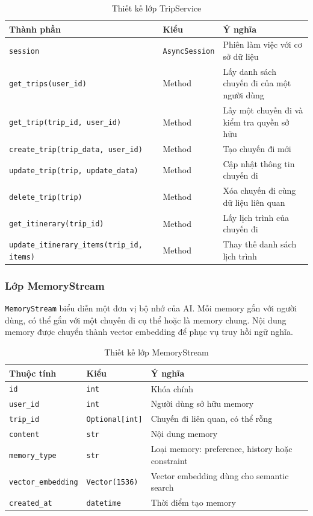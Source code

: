 \documentclass[../DoAn.tex]{subfiles}
\begin{document}
\begin{table}[H]
\centering
\begin{tabular}{lll}
\hline
\textbf{Thành phần} & \textbf{Kiểu} & \textbf{Ý nghĩa} \\ \hline
\texttt{session} & \texttt{AsyncSession} & Phiên làm việc với cơ sở dữ liệu \\ \hline
\texttt{get\_trips(user\_id)} & Method & Lấy danh sách chuyến đi của một người dùng \\ \hline
\texttt{get\_trip(trip\_id, user\_id)} & Method & Lấy một chuyến đi và kiểm tra quyền sở hữu \\ \hline
\texttt{create\_trip(trip\_data, user\_id)} & Method & Tạo chuyến đi mới \\ \hline
\texttt{update\_trip(trip, update\_data)} & Method & Cập nhật thông tin chuyến đi \\ \hline
\texttt{delete\_trip(trip)} & Method & Xóa chuyến đi cùng dữ liệu liên quan \\ \hline
\texttt{get\_itinerary(trip\_id)} & Method & Lấy lịch trình của chuyến đi \\ \hline
\texttt{update\_itinerary\_items(trip\_id, items)} & Method & Thay thế danh sách lịch trình \\ \hline
\end{tabular}
\caption{Thiết kế lớp TripService}
\label{tab:trip-service-design}
\end{table}

\subsubsection{Lớp MemoryStream}

\texttt{MemoryStream} biểu diễn một đơn vị bộ nhớ của AI. Mỗi memory gắn với người dùng, có thể gắn với một chuyến đi cụ thể hoặc là memory chung. Nội dung memory được chuyển thành vector embedding để phục vụ truy hồi ngữ nghĩa.

\begin{table}[H]
\centering
\begin{tabular}{lll}
\hline
\textbf{Thuộc tính} & \textbf{Kiểu} & \textbf{Ý nghĩa} \\ \hline
\texttt{id} & \texttt{int} & Khóa chính \\ \hline
\texttt{user\_id} & \texttt{int} & Người dùng sở hữu memory \\ \hline
\texttt{trip\_id} & \texttt{Optional[int]} & Chuyến đi liên quan, có thể rỗng \\ \hline
\texttt{content} & \texttt{str} & Nội dung memory \\ \hline
\texttt{memory\_type} & \texttt{str} & Loại memory: preference, history hoặc constraint \\ \hline
\texttt{vector\_embedding} & \texttt{Vector(1536)} & Vector embedding dùng cho semantic search \\ \hline
\texttt{created\_at} & \texttt{datetime} & Thời điểm tạo memory \\ \hline
\end{tabular}
\caption{Thiết kế lớp MemoryStream}
\label{tab:memory-stream-design}
\end{table}
\end{document}
